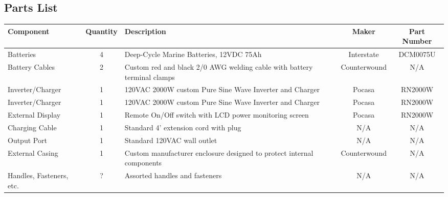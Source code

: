 \documentclass[../jb_user_manual.tex]{subfiles}
\begin{document}
\subsection{Parts List}

\begin{center}
  \normalsize
  \begin{tabular}{ | l | c | p{5cm} | c | c | }
    \hline
        \textbf{Component} & \textbf{Quantity} & \textbf{Description} & \textbf{Maker} & \textbf{Part Number} \\ \hline
        Batteries & 4 & Deep-Cycle Marine Batteries, 12VDC 75Ah & Interstate & DCM0075U \\ \hline
        Battery Cables & 2 & Custom red and black 2/0 AWG welding cable with battery terminal clamps & Counterwound & N/A\\ \hline
        Inverter/Charger & 1 & 120VAC 2000W custom Pure Sine Wave Inverter and Charger & Pocasa & RN2000W \\ \hline
        Inverter/Charger & 1 & 120VAC 2000W custom Pure Sine Wave Inverter and Charger & Pocasa & RN2000W \\ \hline
        External Display & 1 & Remote On/Off switch with LCD power monitoring screen & Pocasa & RN2000W \\ \hline
        Charging Cable & 1 & Standard 4' extension cord with plug & N/A & N/A \\ \hline
        Output Port & 1 & Standard 120VAC wall outlet  & N/A & N/A \\ \hline
        External Casing & 1 & Custom manufacturer enclosure designed to protect internal components & Counterwound & N/A \\ \hline
        Handles, Fasteners, etc. & ? & Assorted handles and fasteners & N/A & N/A \\ \hline
    \end{tabular}
\end{center}
\end{document}
